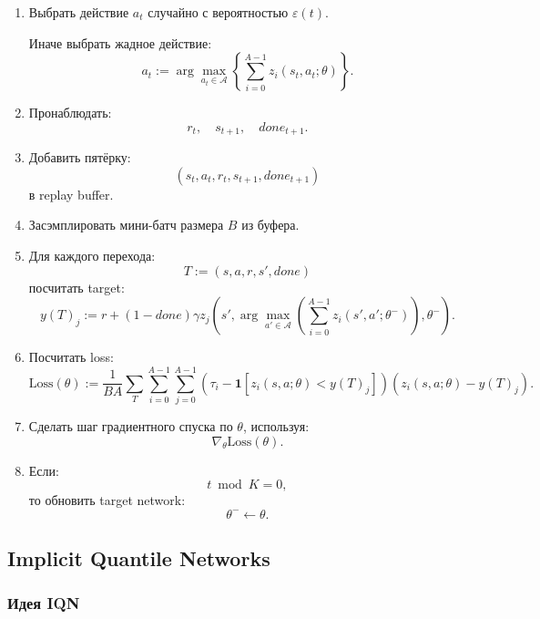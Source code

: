 \documentclass[12pt,a4paper]{article}
\begin{document}
\begin{enumerate}
    \item Выбрать действие $a_t$ случайно с вероятностью $\varepsilon(t)$.

    Иначе выбрать жадное действие:
    \[
    a_t
    :=
    \arg\max_{a_t \in \mathcal A}
    \left\{
    \sum_{i=0}^{A-1}
    z_i(s_t,a_t;\theta)
    \right\}.
    \]

    \item Пронаблюдать:
    \[
    r_t,\quad s_{t+1},\quad done_{t+1}.
    \]

    \item Добавить пятёрку:
    \[
    (s_t,a_t,r_t,s_{t+1},done_{t+1})
    \]
    в replay buffer.

    \item Засэмплировать мини-батч размера $B$ из буфера.

    \item Для каждого перехода:
    \[
    T := (s,a,r,s',done)
    \]
    посчитать target:
    \[
    y(T)_j
    :=
    r
    +
    (1-done)\gamma
    z_j
    \left(
    s',
    \arg\max_{a' \in \mathcal A}
    \left(
    \sum_{i=0}^{A-1}
    z_i(s',a';\theta^-)
    \right),
    \theta^-
    \right).
    \]

    \item Посчитать loss:
    \[
    \mathrm{Loss}(\theta)
    :=
    \frac{1}{BA}
    \sum_T
    \sum_{i=0}^{A-1}
    \sum_{j=0}^{A-1}
    \left(
    \tau_i
    -
    \mathbf 1
    \left[
    z_i(s,a;\theta)<y(T)_j
    \right]
    \right)
    \left(
    z_i(s,a;\theta)-y(T)_j
    \right).
    \]

    \item Сделать шаг градиентного спуска по $\theta$, используя:
    \[
    \nabla_\theta \mathrm{Loss}(\theta).
    \]

    \item Если:
    \[
    t \bmod K = 0,
    \]
    то обновить target network:
    \[
    \theta^- \leftarrow \theta.
    \]
\end{enumerate}

\subsection{Implicit Quantile Networks}

\subsubsection{Идея IQN}
\end{document}
